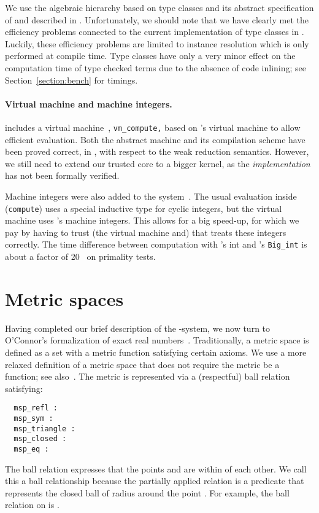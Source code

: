 \documentclass[a4paper,10pt,runningheads]{llncs}
\begin{document}
We use the algebraic hierarchy based on type classes and its abstract specification of  and  described in \cite{math-classes}. Unfortunately, we should note that we have clearly met the efficiency problems connected to the current implementation of type classes in \Coq. Luckily, these efficiency problems are limited to instance resolution which is only performed at compile time. Type classes have only a very minor effect on the computation time of type checked terms due to the absence of code inlining; see Section~\ref{section:bench} for timings. 


\paragraph{Virtual machine and machine integers.}
\label{section:machine}
\Coq{} includes a virtual machine~\cite{Compiler}, \lstinline|vm_compute,| based on \OCaml{}'s virtual machine to allow efficient evaluation. 
Both the abstract machine and its compilation scheme have been proved correct, in \Coq, with respect to the weak reduction semantics. However, we still need to extend our trusted core to a bigger kernel, as the \emph{implementation} has not been formally verified.

Machine integers were also added to the \Coq{} system~\cite{machineintegers}. The usual evaluation inside \Coq{} (\lstinline|compute|) uses a special inductive type for cyclic integers, but the virtual machine uses \OCaml's machine integers. This allows for a big speed-up, for which we pay by having to trust (the virtual machine and) that \OCaml{} treats these integers correctly. The time difference between computation with \Coq's int and \OCaml's \lstinline|Big_int| is about a factor of 20~\cite{thesisSpiwack} on primality tests. 

\section{Metric spaces}\label{section:metricspaces}\label{section:completion-monad}
Having completed our brief description of the \Coq-system, we now turn to O'Connor's formalization of exact real numbers~\cite{OConnor:mscs}. Traditionally, a metric space is defined as a set  with a metric function  satisfying certain axioms. We use a more relaxed definition of a metric space that does not require the metric be a function; see also~\cite{Richman:2008}. The metric is represented via a (respectful) ball relation  satisfying:
\begin{lstlisting}
  msp_refl : 
  msp_sym : 
  msp_triangle : 
  msp_closed : 
  msp_eq : 
\end{lstlisting}
The ball relation  expresses that the points  and  are within  of each other. We call this a ball relationship because the partially applied relation  is a predicate that represents the closed ball of radius  around the point . For example, the ball relation on  is .
\end{document}
